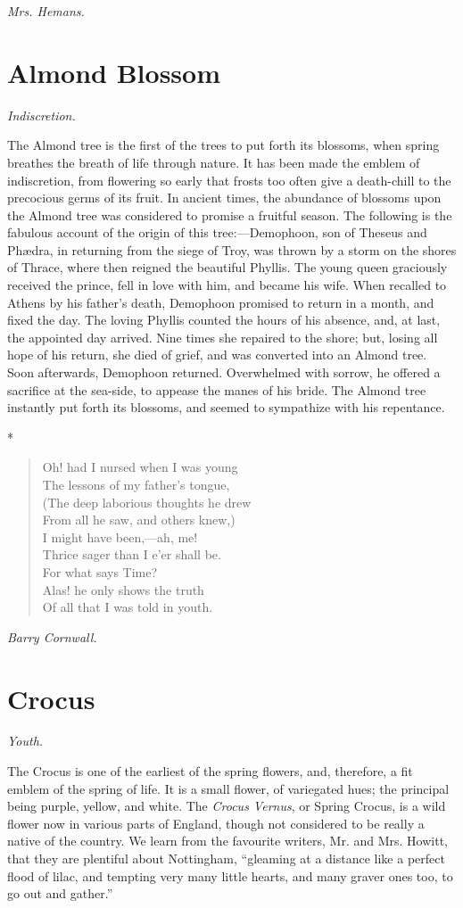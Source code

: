 \documentclass[11pt,twoside]{article}
\newcommand\flower[2]{\section*{#1}\addcontentsline{toc}{section}{#1}%
  \noindent\textit{#2.}\par\medskip}
\newcommand\stars{\begin{center}*\quad*\quad*\end{center}}
\newcommand\by[1]{\par\hfill\textit{#1}\par}
\begin{document}
\by{Mrs. Hemans.}

\flower{Almond Blossom}{Indiscretion}

The Almond tree is the first of the trees to put forth its blossoms, when spring breathes the breath of life through nature. It has been made the emblem of indiscretion, from flowering so early that frosts too often give a death-chill to the precocious germs of its fruit. In ancient times, the abundance of blossoms upon the Almond tree was considered to promise a fruitful season. The following is the fabulous account of the origin of this tree:---Demophoon, son of Theseus and Phædra, in returning from the siege of Troy, was thrown by a storm on the shores of Thrace, where then reigned the beautiful Phyllis. The young queen graciously received the prince, fell in love with him, and became his wife. When recalled to Athens by his father’s death, Demophoon promised to return in a month, and fixed the day. The loving Phyllis counted the hours of his absence, and, at last, the appointed day arrived. Nine times she repaired to the shore; but, losing all hope of his return, she died of grief, and was converted into an Almond tree. Soon afterwards, Demophoon returned. Overwhelmed with sorrow, he offered a sacrifice at the sea-side, to appease the manes of his bride. The Almond tree instantly put forth its blossoms, and seemed to sympathize with his repentance.

\stars

\begin{verse}
Oh! had I nursed when I was young\\
The lessons of my father’s tongue,\\
(The deep laborious thoughts he drew\\
From all he saw, and others knew,)\\
I might have been,---ah, me!\\
Thrice sager than I e’er shall be.\\
\quad For what says Time?\\
Alas! he only shows the truth\\
Of all that I was told in youth.
\end{verse}

\by{Barry Cornwall.}

\flower{Crocus}{Youth}

The Crocus is one of the earliest of the spring flowers, and, therefore, a fit emblem of the spring of life. It is a small flower, of variegated hues; the principal being purple, yellow, and white. The \emph{Crocus Vernus}, or Spring Crocus, is a wild flower now in various parts of England, though not considered to be really a native of the country. We learn from the favourite writers, Mr. and Mrs. Howitt, that they are plentiful about Nottingham, “gleaming at a distance like a perfect flood of lilac, and tempting very many little hearts, and many graver ones too, to go out and gather.”
\end{document}
